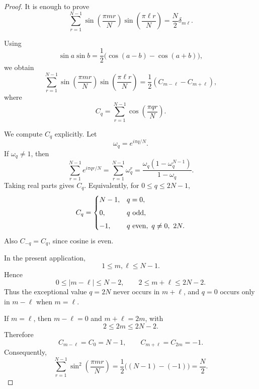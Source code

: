 \documentclass[11pt]{amsart}
\numberwithin{equation}{section}
\theoremstyle{plain}
\theoremstyle{definition}
\theoremstyle{remark}
\begin{document}
\begin{proof}

It is enough to prove
\begin{equation}
\sum_{r=1}^{N-1}
\sin\left(\frac{\pi m r}{N}\right)
\sin\left(\frac{\pi \ell r}{N}\right)
=
\frac{N}{2}\delta_{m\ell}.
\label{eq:unnormalized_sine_orthogonality}
\end{equation}

Using
\[
\sin a\sin b
=
\frac12\bigl(\cos(a-b)-\cos(a+b)\bigr),
\]
we obtain
\begin{equation}
\sum_{r=1}^{N-1}
\sin\left(\frac{\pi m r}{N}\right)
\sin\left(\frac{\pi \ell r}{N}\right)
=
\frac12
\left(
C_{m-\ell}-C_{m+\ell}
\right),
\label{eq:sine_inner_product_Cq_reduction}
\end{equation}
where
\begin{equation}
C_q
=
\sum_{r=1}^{N-1}
\cos\left(\frac{\pi q r}{N}\right).
\label{eq:Cq_cosine_sum_definition}
\end{equation}

We compute \(C_q\) explicitly. Let
\[
\omega_q=e^{i\pi q/N}.
\]
If \(\omega_q\ne1\), then
\begin{equation}
\sum_{r=1}^{N-1}e^{i\pi q r/N}
=
\sum_{r=1}^{N-1}\omega_q^r
=
\frac{\omega_q(1-\omega_q^{N-1})}{1-\omega_q}.
\label{eq:Cq_geometric_sum}
\end{equation}
Taking real parts gives \(C_q\). Equivalently, for \(0\le q\le 2N-1\),
\begin{equation}
C_q
=
\begin{cases}
N-1, & q=0,\\[4pt]
0, & q\ {\rm odd},\\[4pt]
-1, & q\ {\rm even},\ q\ne0,\ 2N.
\end{cases}
\label{eq:Cq_values}
\end{equation}
Also \(C_{-q}=C_q\), since cosine is even.

In the present application,
\[
1\le m,\ell\le N-1.
\]
Hence
\begin{equation}
0\le |m-\ell|\le N-2,
\qquad
2\le m+\ell\le 2N-2.
\label{eq:Cq_index_range}
\end{equation}
Thus the exceptional value \(q=2N\) never occurs in \(m+\ell\), and \(q=0\) occurs only in \(m-\ell\) when \(m=\ell\).

If \(m=\ell\), then \(m-\ell=0\) and \(m+\ell=2m\), with
\[
2\le 2m\le 2N-2.
\]
Therefore
\[
C_{m-\ell}=C_0=N-1,
\qquad
C_{m+\ell}=C_{2m}=-1.
\]
Consequently,
\begin{equation}
\sum_{r=1}^{N-1}
\sin^2\left(\frac{\pi m r}{N}\right)
=
\frac12\bigl((N-1)-(-1)\bigr)
=
\frac{N}{2}.
\label{eq:diagonal_sine_norm}
\end{equation}


\end{proof}
\end{document}
